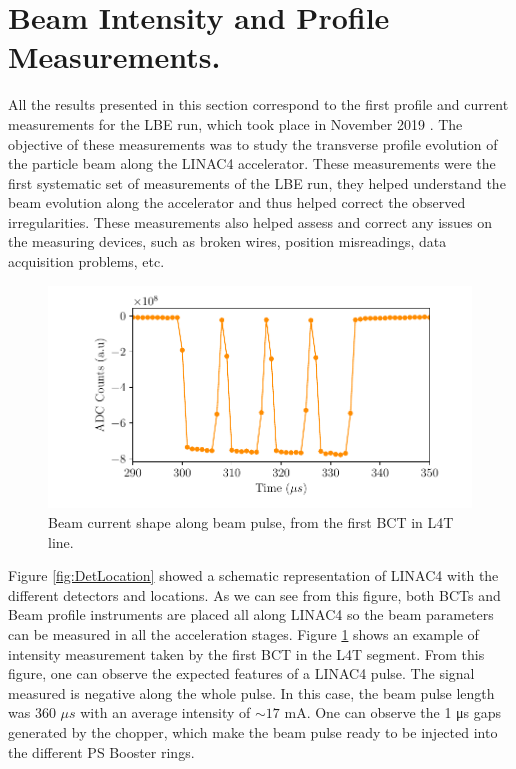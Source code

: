 \section{Beam Intensity and Profile Measurements.}
\label{sec:LBE}

All the results presented in this section correspond to the first profile and current measurements for the LBE run, which took place in November 2019 \parencite*[][]{ref:PresentationLBERun}. The objective of these measurements was to study the transverse profile evolution of the particle beam along the LINAC4 accelerator. These measurements were the first systematic set of measurements of the LBE run, they helped understand the beam evolution along the accelerator and thus helped correct the observed irregularities. These measurements also helped assess and correct any issues on the measuring devices, such as broken wires, position misreadings, data acquisition problems, etc.  

\begin{figure}[h]
    \centering
    \includegraphics[width=1.0\columnwidth]{IntensityVStime/IntensityVStime.pdf}
    \caption[The LOF caption]{Beam current shape along beam pulse, from the first BCT in L4T line.}
    \label{fig:BCTwithTime}
\end{figure}

Figure \ref{fig:DetLocation} showed a schematic representation of LINAC4 with the different detectors and locations. As we can see from this figure, both BCTs and Beam profile instruments are placed all along LINAC4 so the beam parameters can be measured in all the acceleration stages. Figure \ref{fig:BCTwithTime} shows an example of intensity measurement taken by the first BCT in the L4T segment. From this figure, one can observe the expected features of a LINAC4 pulse. The signal measured is negative along the whole pulse. In this case, the beam pulse length was 360 $\mu s$ with an average intensity of $\sim 17 $ \si[]{\milli \ampere}. One can observe the 1 \si[]{\micro \second} gaps generated by the chopper, which make the beam pulse ready to be injected into the different PS Booster rings. 

